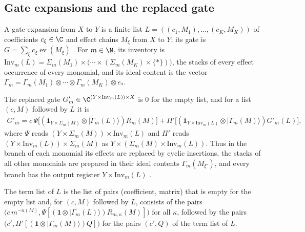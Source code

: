 \subsection{Gate expansions and the replaced gate}
\label{sec:party_gate_expansions}

\begin{definition}
    \label{def:party_gate_expansion}
    \leanok
    A gate expansion from $X$ to $Y$ is a finite list
    $L=((c_1,M_1),\dots,(c_K,M_K))$ of coefficients $c_\xi\in\C$ and effect
    chains $M_\xi$ from $X$ to $Y$; its gate is
    $G=\sum_\xi c_\xi\operatorname{ev}(M_\xi)$
    \cite[Lemma~5.1]{OpenAI2026PolynomialPEPS}. For $m\in\N$, its inventory
    is $\mathrm{Inv}_m(L)=\Sigma_m(M_1)\times\bigl(\cdots\times
        (\Sigma_m(M_K)\times\{*\})\bigr)$, the stacks of every effect
    occurrence of every monomial, and its ideal content is the vector
    $\Gamma_m=\Gamma_m(M_1)\otimes\cdots\otimes\Gamma_m(M_K)\otimes e_*$.

    The replaced gate
    $G'_m\in\C^{(Y\times\mathrm{Inv}_m(L))\times X}$ is $0$ for the empty
    list, and for a list $(c,M)$ followed by $L$ it is
    \begin{align}
        G'_m=c\,\Psi\bigl[(\mathbf 1_{Y\times\Sigma_m(M)}\otimes
                        |\Gamma_m(L)\rangle)R_m(M)\bigr]
        +\Pi'\bigl[(\mathbf 1_{Y\times\mathrm{Inv}_m(L)}\otimes
                 |\Gamma_m(M)\rangle)G'_m(L)\bigr],
        \label{eq:party_replace_gate}
    \end{align}
    where $\Psi$ reads $(Y\times\Sigma_m(M))\times\mathrm{Inv}_m(L)$ and
    $\Pi'$ reads $(Y\times\mathrm{Inv}_m(L))\times\Sigma_m(M)$ as
    $Y\times(\Sigma_m(M)\times\mathrm{Inv}_m(L))$. Thus in the branch of
    each monomial its effects are replaced by cyclic insertions, the stacks
    of all other monomials are prepared in their ideal contents
    $\Gamma_m(M_{\xi'})$, and every branch has the output register
    $Y\times\mathrm{Inv}_m(L)$ \cite[proof of
        Lemma~5.1]{OpenAI2026PolynomialPEPS}.

    The term list of $L$ is the list of pairs (coefficient, matrix) that is
    empty for the empty list and, for $(c,M)$ followed by $L$, consists of
    the pairs
    $\bigl(c\,m^{-n(M)},\Psi[(\mathbf 1\otimes|\Gamma_m(L)\rangle)
            R_{m,\kappa}(M)]\bigr)$ for all $\kappa$, followed by the pairs
    $\bigl(c',\Pi'[(\mathbf 1\otimes|\Gamma_m(M)\rangle)Q]\bigr)$ for the
    pairs $(c',Q)$ of the term list of $L$.
\end{definition}

